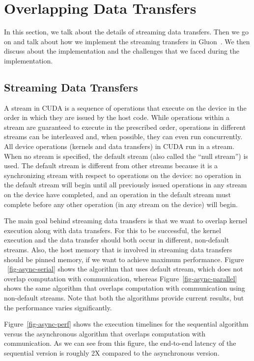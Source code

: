 \section{Overlapping Data Transfers}
\label{sec-async}

In this section, we talk about the details of streaming data transfers. Then we go on and talk about how we implement the streaming transfers in Gluon~\cite{dathathri2018gluon}. We then discuss about the implementation and the challenges that we faced during the implementation. 

\subsection{Streaming Data Transfers}

A stream in CUDA is a sequence of operations that execute on the device in the order in which they are issued by the host code. While operations within a stream are guaranteed to execute in the prescribed order, operations in different streams can be interleaved and, when possible, they can even run concurrently. All device operations (kernels and data transfers) in CUDA run in a stream. When no stream is specified, the default stream (also called the “null stream”) is used. The default stream is different from other streams because it is a synchronizing stream with respect to operations on the device: no operation in the default stream will begin until all previously issued operations in any stream on the device have completed, and an operation in the default stream must complete before any other operation (in any stream on the device) will begin.



The main goal behind streaming data transfers is that we want to overlap kernel execution along with data transfers. For this to be successful, the kernel execution and the data transfer should both occur in different, non-default streams. Also, the host memory that is involved in streaming data transfers should be pinned memory, if we want to achieve maximum performance. Figure ~\ref{fig-async-serial} shows the algorithm that uses default stream, which does not overlap computation with communication, whereas Figure~\ref{fig-async-parallel} shows the same algorithm that overlaps computation with communication using non-default streams. Note that both the algorithms provide current results, but the performance varies significantly. 


Figure~\ref{fig-async-perf} shows the execution timelines for the sequential algorithm versus the asynchronous algorithm that overlaps computation with communication. As we can see from this figure, the end-to-end latency of the sequential version is roughly 2X compared to the asynchronous version. 

